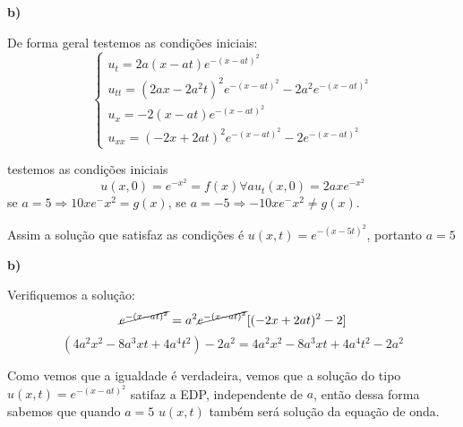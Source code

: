 \textbf{b)}

De forma geral testemos as condições iniciais:
\begin{equation*}
    \begin{cases}
        u_t = 2a(x-at)e^{-(x-at)^2}\\
        u_{tt} = (2ax - 2a^2t)^2e^{-(x-at)^2}-2a^2e^{-(x-at)^2}\\
        u_x = -2(x-at)e^{-(x-at)^2}\\
        u_{xx} = (-2x+2at)^2e^{-(x-at)^2} - 2e^{-(x-at)^2}
    \end{cases}
\end{equation*}

testemos as condições iniciais 
\begin{equation*}
    u(x,0) =  e^{-x^2} = f(x)  \forall a
    u_t(x, 0) = 2axe^{-x^2}
\end{equation*}
se $a=5 \Rightarrow 10xe^-x^2 = g(x)$, se $a=-5 \Rightarrow -10xe^-x^2 \neq g(x)$.

Assim a solução que satisfaz as condições é $\boxed{u(x,t) = e^{-(x-5t)^2}}$, portanto $a=5$

\textbf{b)}

Verifiquemos a solução:
\begin{equation*}
    [(2ax - 2a^2t)^2 - 2a^2]\cancel{e^{-(x-at)^2}} = a^2\cancel{e^{-(x-at)^2}}[(-2x+2at)^2 - 2]
\end{equation*}
\begin{equation*}
    (4a^2x^2 - 8a^3xt + 4a^4t^2) - 2a^2 = 4a^2x^2 - 8a^3xt + 4a^4t^2 -2a^2
\end{equation*}

Como vemos que a igualdade é verdadeira, vemos que a solução do tipo $u(x,t) = e^{-(x-at)^2}$ satifaz a EDP, independente de $a$, então dessa forma sabemos que quando $a=5$ $u(x,t)$ também será solução da equação de onda.